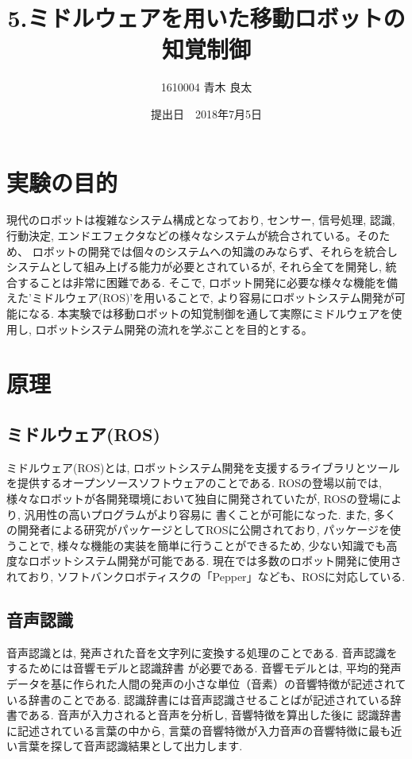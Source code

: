 \documentclass[a4paper,11pt,titlepage]{jsarticle}
\title{5.ミドルウェアを用いた移動ロボットの知覚制御}
\author{1610004 青木 良太}
\date{提出日　2018年7月5日} %
\begin{document}
\maketitle

\section{実験の目的}
現代のロボットは複雑なシステム構成となっており, センサー, 信号処理, 認識, 行動決定, エンドエフェクタなどの様々なシステムが統合されている。そのため、
ロボットの開発では個々のシステムへの知識のみならず、それらを統合しシステムとして組み上げる能力が必要とされているが, それら全てを開発し, 統合することは非常に困難である.
そこで, ロボット開発に必要な様々な機能を備えた'ミドルウェア(ROS)'を用いることで, より容易にロボットシステム開発が可能になる.
本実験では移動ロボットの知覚制御を通して実際にミドルウェアを使用し, ロボットシステム開発の流れを学ぶことを目的とする。

\section{原理}
\subsection{ミドルウェア(ROS)}
ミドルウェア(ROS)とは, ロボットシステム開発を支援するライブラリとツールを提供するオープンソースソフトウェアのことである.
ROSの登場以前では, 様々なロボットが各開発環境において独自に開発されていたが, ROSの登場により, 汎用性の高いプログラムがより容易に
書くことが可能になった. また, 多くの開発者による研究がパッケージとしてROSに公開されており, パッケージを使うことで,
様々な機能の実装を簡単に行うことができるため, 少ない知識でも高度なロボットシステム開発が可能である.
現在では多数のロボット開発に使用されており, ソフトバンクロボティスクの「Pepper」なども、ROSに対応している.

\subsection{音声認識}
音声認識とは, 発声された音を文字列に変換する処理のことである. 音声認識をするためには音響モデルと認識辞書
が必要である. 音響モデルとは, 平均的発声データを基に作られた人間の発声の小さな単位（音素）の音響特徴が記述されている辞書のことである.
認識辞書には音声認識させることばが記述されている辞書である. 音声が入力されると音声を分析し, 音響特徴を算出した後に
認識辞書に記述されている言葉の中から, 言葉の音響特徴が入力音声の音響特徴に最も近い言葉を探して音声認識結果として出力します.
\end{document}
